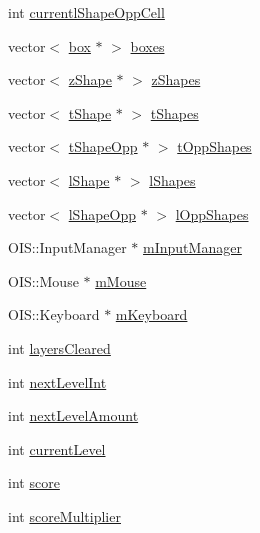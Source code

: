\begin{DoxyCompactItemize}
\item 
int \hyperlink{class_base_application_ad8dd5ed80f7ab80b4c8a88e83b251b05}{currentl\-Shape\-Opp\-Cell}
\item 
vector$<$ \hyperlink{classbox}{box} $\ast$ $>$ \hyperlink{class_base_application_ade32bf8c002709296ed8d0a789d8cbba}{boxes}
\item 
vector$<$ \hyperlink{classz_shape}{z\-Shape} $\ast$ $>$ \hyperlink{class_base_application_aa412bf0f968f597ca1ab77738eafd5f5}{z\-Shapes}
\item 
vector$<$ \hyperlink{classt_shape}{t\-Shape} $\ast$ $>$ \hyperlink{class_base_application_aec2d0eebbcdd4364649da4f412cdbb24}{t\-Shapes}
\item 
vector$<$ \hyperlink{classt_shape_opp}{t\-Shape\-Opp} $\ast$ $>$ \hyperlink{class_base_application_a38ff9c55061692b43d1d56de9bf3a363}{t\-Opp\-Shapes}
\item 
vector$<$ \hyperlink{classl_shape}{l\-Shape} $\ast$ $>$ \hyperlink{class_base_application_a064956fbdf1b5ae2c187530ec7642b68}{l\-Shapes}
\item 
vector$<$ \hyperlink{classl_shape_opp}{l\-Shape\-Opp} $\ast$ $>$ \hyperlink{class_base_application_ad4c357854ba045adac9bd2016452bb8b}{l\-Opp\-Shapes}
\item 
O\-I\-S\-::\-Input\-Manager $\ast$ \hyperlink{class_base_application_abc9503c8462e225b5d0d55c952d9e4a9}{m\-Input\-Manager}
\item 
O\-I\-S\-::\-Mouse $\ast$ \hyperlink{class_base_application_add9b97fbe64da2814d3af113bac58c43}{m\-Mouse}
\item 
O\-I\-S\-::\-Keyboard $\ast$ \hyperlink{class_base_application_a9d6e19cf50c47379fbaae55bff28079c}{m\-Keyboard}
\item 
int \hyperlink{class_base_application_a854f2a19c04bc06c187fcf5f771966cc}{layers\-Cleared}
\item 
int \hyperlink{class_base_application_abaf901b9f1c0b913235a8d818ece8772}{next\-Level\-Int}
\item 
int \hyperlink{class_base_application_a48aa9aa0d39fac2805d912b9f4e8d593}{next\-Level\-Amount}
\item 
int \hyperlink{class_base_application_a1408e82cf9d072d8b35505b7f42d8565}{current\-Level}
\item 
int \hyperlink{class_base_application_a681cfe91d2cee55f8d783651a074fdcf}{score}
\item 
int \hyperlink{class_base_application_a4484039f7dfe0e4eaa962a4fa781bc88}{score\-Multiplier}
\item 

\end{DoxyCompactItemize}

